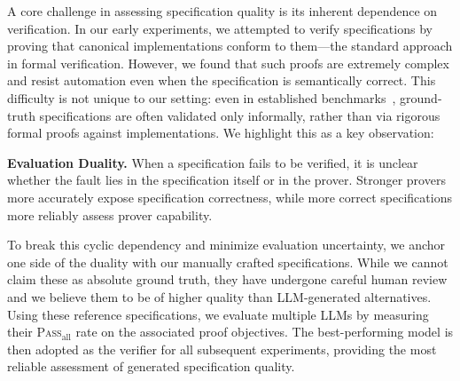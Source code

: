 
\label{sec:rq1}


A core challenge in assessing specification quality is its inherent dependence on verification. In our early experiments, we attempted to verify specifications by proving that canonical implementations conform to them---the standard approach in formal verification. However, we found that such proofs are extremely complex and resist automation even when the specification is semantically correct. This difficulty is not unique to our setting: even in established benchmarks~\cite{thakur2025clever,ye2026verina}, ground-truth specifications are often validated only informally, rather than via rigorous formal proofs against implementations. We highlight this as a key observation:


\vspace{0.6em}
\begin{tcolorbox}[
  colback=gray!10,
  colframe=gray!60,
  boxrule=0.6pt,
  arc=2pt,
  left=6pt,
  right=6pt,
  top=6pt,
  bottom=6pt
]
\small
\label{duality}
\textbf{Evaluation Duality.}
When a specification fails to be verified, it is unclear whether the fault lies
in the specification itself or in the prover.
Stronger provers more accurately expose specification correctness,
while more correct specifications more reliably assess prover capability.
\end{tcolorbox}
\vspace{0.6em}


To break this cyclic dependency and minimize evaluation uncertainty, we anchor one side of the duality with our manually crafted specifications. While we cannot claim these as absolute ground truth, they have undergone careful human review and we believe them to be of higher quality than LLM-generated alternatives. Using these reference specifications, we evaluate multiple LLMs by measuring their \textsc{Pass}$_{\text{all}}$ rate on the associated proof objectives. The best-performing model is then adopted as the verifier for all subsequent experiments, providing the most reliable assessment of generated specification quality.


